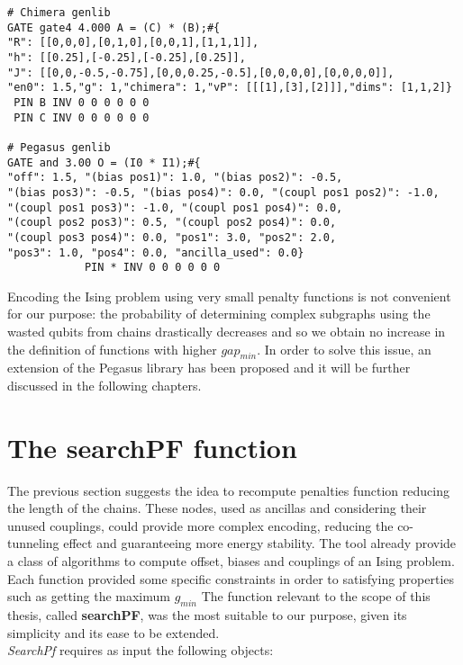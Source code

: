  \begin{lstlisting}[style=interfaces,caption=The definition of the penalty function \text{$A = B \wedge C$} according to the Chimera and Pegasus libraries. While the conversion of most data would be trivial (in particular weights of biases and couplings) it would be difficult to map Chimera encodings (which are mapped using Chimera tiles as basic unit) into Pegasus (which does not provide the concept of tile).]
# Chimera genlib
GATE gate4 4.000 A = (C) * (B);#{
"R": [[0,0,0],[0,1,0],[0,0,1],[1,1,1]],
"h": [[0.25],[-0.25],[-0.25],[0.25]],
"J": [[0,0,-0.5,-0.75],[0,0,0.25,-0.5],[0,0,0,0],[0,0,0,0]],
"en0": 1.5,"g": 1,"chimera": 1,"vP": [[[1],[3],[2]]],"dims": [1,1,2]}
 PIN B INV 0 0 0 0 0 0
 PIN C INV 0 0 0 0 0 0
 
# Pegasus genlib
GATE and 3.00 O = (I0 * I1);#{
"off": 1.5, "(bias pos1)": 1.0, "(bias pos2)": -0.5, 
"(bias pos3)": -0.5, "(bias pos4)": 0.0, "(coupl pos1 pos2)": -1.0,
"(coupl pos1 pos3)": -1.0, "(coupl pos1 pos4)": 0.0,
"(coupl pos2 pos3)": 0.5, "(coupl pos2 pos4)": 0.0, 
"(coupl pos3 pos4)": 0.0, "pos1": 3.0, "pos2": 2.0, 
"pos3": 1.0, "pos4": 0.0, "ancilla_used": 0.0}
            PIN * INV 0 0 0 0 0 0
\end{lstlisting}

 Encoding the Ising problem using very small penalty functions is not convenient for our purpose: the probability of determining complex subgraphs using the wasted qubits from chains drastically decreases and so we obtain no increase in the definition of functions with higher $gap_{min}$. In order to solve this issue, an extension of the Pegasus library has been proposed and it will be further discussed in the following chapters.


\section{The searchPF function}

The previous section suggests the idea to recompute penalties function reducing the length of the chains. These nodes, used as ancillas and considering their unused couplings, could provide more complex encoding, reducing the co-tunneling effect and guaranteeing more energy stability. The tool already provide a class of algorithms to compute offset, biases and couplings of an Ising problem. Each function provided some specific constraints in order to satisfying properties such as getting the maximum $g_{min}$  The function relevant to the scope of this thesis, called \textbf{searchPF}, was the most suitable to our purpose, given its simplicity and its ease to be extended. \\
\textit{SearchPf} requires as input the following objects:


